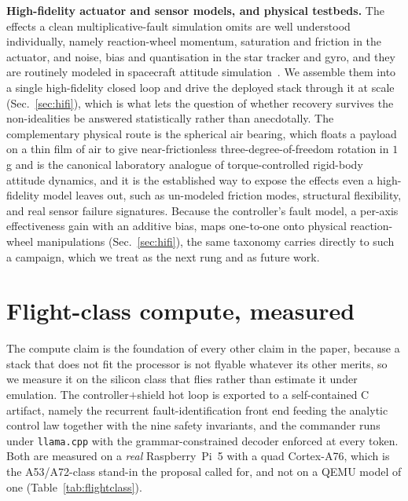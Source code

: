\documentclass[journal]{IEEEtran}
\begin{document}
\noindent\textbf{High-fidelity actuator and sensor models, and physical testbeds.} The effects a
clean multiplicative-fault simulation omits are well understood individually, namely
reaction-wheel momentum, saturation and friction in the actuator, and noise, bias and
quantisation in the star tracker and gyro, and they are routinely modeled in spacecraft attitude
simulation~\cite{Schaub2018,Wie2008}. We assemble them into a single high-fidelity closed loop and
drive the deployed stack through it at scale (Sec.~\ref{sec:hifi}), which is what lets the
question of whether recovery survives the non-idealities be answered statistically rather than
anecdotally. The complementary physical route is the spherical air bearing, which floats a payload
on a thin film of air to give near-frictionless three-degree-of-freedom rotation in $1$\,g and is
the canonical laboratory analogue of torque-controlled rigid-body attitude dynamics, and it is the
established way to expose the effects even a high-fidelity model leaves out, such as un-modeled
friction modes, structural flexibility, and real sensor failure signatures. Because the
controller's fault model, a per-axis effectiveness gain with an additive bias, maps one-to-one
onto physical reaction-wheel manipulations (Sec.~\ref{sec:hifi}), the same taxonomy carries
directly to such a campaign, which we treat as the next rung and as future work.

\section{Flight-class compute, measured}
\label{sec:compute}
The compute claim is the foundation of every other claim in the paper, because a stack that does
not fit the processor is not flyable whatever its other merits, so we measure it on the silicon
class that flies rather than estimate it under emulation. The controller$+$shield hot loop is
exported to a self-contained C artifact, namely the recurrent fault-identification front end
feeding the analytic control law together with the nine safety invariants, and the commander runs
under \texttt{llama.cpp} with the grammar-constrained decoder enforced at every token. Both are
measured on a \emph{real} Raspberry~Pi~5 with a quad Cortex-A76, which is the A53/A72-class
stand-in the proposal called for, and not on a QEMU model of one (Table~\ref{tab:flightclass}).
\end{document}
